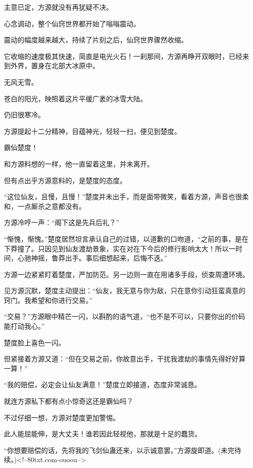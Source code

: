 \begin{this_body}
主意已定，方源就没有再犹疑不决。

心念调动，整个仙窍世界都开始了嗡嗡震动。

震动的幅度越来越大，持续了片刻之后，仙窍世界骤然收缩。

它收缩的速度极其快速，简直是电光火石！一刹那间，方源再睁开双眼时，已经来到外界，置身在北部大冰原中。

无风无雪。

苍白的阳光，映照着这片平缓广袤的冰雪大陆。

仍旧很寒冷。

方源提起十二分精神，目蕴神光，轻轻一扫，便见到楚度。

霸仙楚度！

和方源料想的一样，他一直留着这里，并未离开。

但有点出乎方源意料的，是楚度的态度。

“这位仙友，且慢，且慢！”楚度并未出手，而是面带微笑，看着方源，声音也很柔和，一点厮杀之意都没有。

方源冷哼一声：“阁下这是先兵后礼？”

“惭愧，惭愧。”楚度居然坦言承认自己的过错，以道歉的口吻道，“之前的事，是在下莽撞了。只因见到仙友渡劫景象，实在对在下今后的修行影响太大！所以一时间，心驰神摇，鲁莽出手。事后细想起来，后悔不迭。”

方源一边紧紧盯着楚度，严加防范。另一边则一直在用诸多手段，侦查周遭环境。

见方源沉默，楚度主动提出：“仙友，我无意与你为敌，只在意你引动狂蛮真意的窍门。我希望和你进行交易。”

“交易？”方源眼中精芒一闪，以斟酌的语气道，“也不是不可以，只要你出的价码能打动我心。”

楚度脸上喜色一闪。

但紧接着方源又道：“但在交易之前，你故意出手，干扰我渡劫的事情先得好好算一算！”

“我的赔偿，必定会让仙友满意！”楚度立即接道，态度非常诚恳。

就连方源私下都有点小惊奇这还是霸仙吗？

不过仔细一想，方源对楚度更加警惕。

此人能屈能伸，是大丈夫！谁若因此轻视他，那就是十足的蠢货。

“你想要赔偿的话，先将我的飞剑仙蛊还来，以示诚意罢。”方源旋即道。(未完待续。)<!--80txt.com-ouoou-->

\end{this_body}

